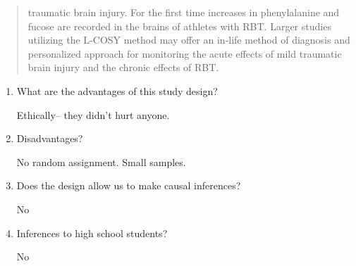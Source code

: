 \begin{enumerate}
{\begin{quotation}
traumatic brain injury. For the first time increases in phenylalanine
and fucose are recorded in the brains of athletes with RBT. Larger
studies utilizing the L-COSY method may offer an in-life method of
diagnosis and personalized approach for monitoring the acute effects
of mild traumatic brain injury and the chronic effects of RBT. 
\end{quotation}
}
\begin{enumerate}
\item  What are the advantages of this study design?
\begin{students}
 \vfill
\end{students}

\begin{key}
 Ethically-- they didn't hurt anyone.
\end{key}



\item Disadvantages?
\begin{students}
 \vfill
\end{students}

\begin{key}
No random assignment.  Small samples.
\end{key}



\item Does the design allow us to make causal
    inferences?
\begin{students}
 \vspace{.6cm}
\end{students}

\begin{key} No
\end{key}



\item Inferences to high school students?
\begin{students}
\vspace*{.6cm}
\newpage
\end{students}

\begin{key} No
\end{key}


\end{enumerate}
\end{enumerate}
